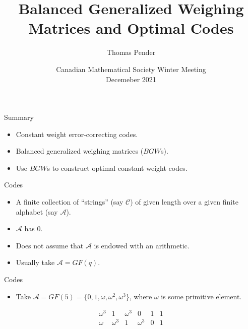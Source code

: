 \documentclass{beamer}
\title[BGWs and Codes]{Balanced Generalized Weighing Matrices and Optimal Codes}
\author[T. Pender]{Thomas Pender}
\institute[U of L]{University of Lethbridge\\Department of Mathematics and Computer Science}
\date[CMS Dec 2021]{Canadian Mathematical Society Winter Meeting\\Decemeber 2021}
\newcommand{\A}{\mathcal{A}}
\newcommand{\C}{\mathscr{C}}
\begin{document}

\begin{frame}

 \titlepage
\end{frame}

\begin{frame}{Summary}
 \begin{itemize}
  \item Constant weight error-correcting codes.
  \item Balanced generalized weighing matrices ($BGW$s).
  \item Use $BGW$s to construct optimal constant weight codes.
 \end{itemize}
 
\end{frame}


\begin{frame}{Codes}

 \begin{itemize}
  \item A finite collection of ``strings'' (say $\C$) of given length over a given finite alphabet (say $\A$).
  \item $\A$ has 0.
  \item Does not assume that $\A$ is endowed with an arithmetic.
  \item Usually take $\A = GF(q)$.
 \end{itemize}

 \end{frame}
 
 
 \begin{frame}{Codes}

 \begin{itemize}
  \item Take $\A = GF(5) = \{0, 1, \omega, \omega^2, \omega^3\}$, where $\omega$ is some primitive element.
 \end{itemize}
 \pause
 \[
  \begin{array}{cccccc}
\omega^3&1&\omega^3&0&1&1\\ 
\omega&\omega^3&1&\omega^3&0&1
  \end{array}
 \]
 
 \end{frame}
 
\end{document}

